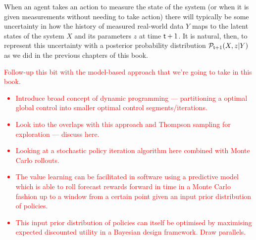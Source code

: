 When an agent takes an action to measure the state of the system (or when it is given measurements without needing to take action) there will typically be some uncertainty in how the history of measured real-world data $Y$ maps to the latent states of the system $X$ and its parameters $z$ at time ${\sf t}+1$. It is natural, then, to represent this uncertainty with a posterior probability distribution ${\cal P}_{{\sf t}+1}(X,z\vert Y)$ as we did in the previous chapters of this book.

\textcolor{red}{
Follow-up this bit with the model-based approach that we're going to take in this book.
\begin{itemize}
\item{Introduce broad concept of dynamic programming --- partitioning a optimal global control into smaller optimal control segments/iterations.}
\item{Look into the overlaps with this approach and Thompson sampling for exploration --- discuss here.}
\item{Looking at a stochastic policy iteration algorithm here combined with Monte Carlo rollouts.}
\item{The value learning can be facilitated in software using a predictive model which is able to roll forecast rewards forward in time in a Monte Carlo fashion up to a window from a certain point given an input prior distribution of policies.}
\item{This input prior distribution of policies can itself be optimised by maximising expected discounted utility in a Bayesian design framework. Draw parallels.}
\end{itemize}
}